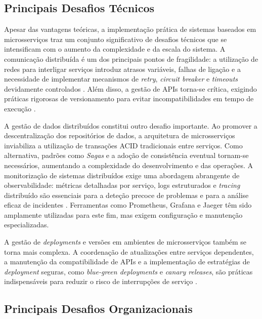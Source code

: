 \subsection{Principais Desafios Técnicos}

Apesar das vantagens teóricas, a implementação prática de sistemas baseados em microsserviços traz um conjunto significativo de desafios técnicos que se intensificam com o aumento da complexidade e da escala do sistema. A comunicação distribuída é um dos principais pontos de fragilidade: a utilização de redes para interligar serviços introduz atrasos variáveis, falhas de ligação e a necessidade de implementar mecanismos de \textit{retry}, \textit{circuit breaker} e \textit{timeouts} devidamente controlados \cite{Nygard2018,Newman2015}. Além disso, a gestão de APIs torna-se crítica, exigindo práticas rigorosas de versionamento para evitar incompatibilidades em tempo de execução \cite{Richardson2018}.

A gestão de dados distribuídos constitui outro desafio importante. Ao promover a descentralização dos repositórios de dados, a arquitetura de microsserviços inviabiliza a utilização de transações ACID tradicionais entre serviços. Como alternativa, padrões como \textit{Sagas} \cite{GarciaMolina1987} e a adoção de consistência eventual tornam-se necessários, aumentando a complexidade do desenvolvimento e das operações. A monitorização de sistemas distribuídos exige uma abordagem abrangente de observabilidade: métricas detalhadas por serviço, logs estruturados e \textit{tracing} distribuído são essenciais para a deteção precoce de problemas e para a análise eficaz de incidentes \cite{Burns2015}. Ferramentas como Prometheus, Grafana e Jaeger têm sido amplamente utilizadas para este fim, mas exigem configuração e manutenção especializadas.

A gestão de \textit{deployments} e versões em ambientes de microsserviços também se torna mais complexa. A coordenação de atualizações entre serviços dependentes, a manutenção da compatibilidade de APIs e a implementação de estratégias de \textit{deployment} seguras, como \textit{blue-green deployments} e \textit{canary releases}, são práticas indispensáveis para reduzir o risco de interrupções de serviço \cite{Humble2010}.

\subsection{Principais Desafios Organizacionais}

